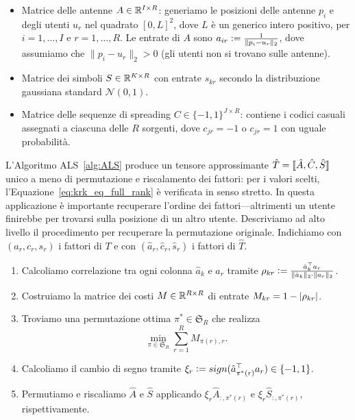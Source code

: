 \begin{itemize}
	\item Matrice delle antenne $ A \in \mathbb{R}^{I \times R}$: generiamo le posizioni delle antenne $ p_{i}
	      $ e degli utenti $ u_{r} $ nel quadrato $ [0,L]^2 $, dove $ L $ è un generico intero
	      positivo, per $ i = 1, \ldots, I $ e $ r = 1, \ldots, R $. Le entrate di $ A $ sono $ a_{ir}
		      \vcentcolon= \frac{1}{\| p_{i} - u_{r} \|_{2}}$, dove assumiamo che $ \| p_{i} - u_{r} \|_{2} >
		      0$ (gli utenti non si trovano sulle antenne).
	\item Matrice dei simboli $ S \in \mathbb{R}^{K \times R} $ con entrate $ s_{kr} $ secondo la
	      distribuzione gaussiana standard
	      $ \mathcal{N}(0,1) $.
	\item Matrice delle sequenze di spreading $ C \in \{-1,1\}^{J \times R}  $: contiene i codici
	      casuali assegnati a ciascuna delle $ R $ sorgenti, dove $ c_{jr} = -1 $ o $ c_{jr} = 1 $ con
	      uguale probabilità.
\end{itemize}
L'Algoritmo ALS~\ref{alg:ALS} produce un tensore approssimante $ \hat{T} = \dsqr{\hat{A}, \hat{C},
		\hat{S}} $ unico a meno di permutazione e riscalamento dei fattori: per i valori scelti, l'Equazione~\ref{eq:krk_eq_full_rank} è
verificata in senso stretto. In questa applicazione è importante recuperare l'ordine dei
fattori---altrimenti un utente finirebbe per trovarsi sulla posizione di un altro utente.
Descriviamo ad alto livello il procedimento per recuperare la permutazione originale. Indichiamo con $ (a_{r},c_{r},s_{r}) $ i fattori di $ T $ e
con $ (\hat{a}_{r}, \hat{c}_{r}, \hat{s}_{r}) $ i fattori di $ \hat{T} $.
\begin{enumerate}
	\item Calcoliamo correlazione tra ogni colonna $ \hat{a}_{k} $ e $ a_{r} $ tramite $ \rho_{kr}
		      \vcentcolon= \frac{\hat{a}^{\top}_{k}a_{r}}{\|\hat{a}_{k}\|_{2} \cdot \|a_{r} \|_{2}}$.
	\item Costruiamo la matrice dei costi $ M \in \mathbb{R}^{R\times R} $ di entrate $ M_{kr} = 1 -
		      \abs{\rho_{kr}} $.
	\item Troviamo una permutazione ottima $ \pi^* \in \mathfrak{S}_{R} $ che realizza
	      \begin{equation*}
		      \min_{\pi \in \mathfrak{S}_{R}} \sum_{r=1}^R M_{\pi(r),r}.
	      \end{equation*}
	\item Calcoliamo il cambio di segno tramite $ \xi_{r} \vcentcolon=
		      \mathop{sign}(\hat{a}^{\top}_{\pi^*(r)}a_{r}) \in \{-1,1\} $.
	\item Permutiamo e riscaliamo $ \hat{A} $ e $\hat{S} $ applicando $ \xi_{r}\hat{A}_{:, \pi^*(r)} $ e
	      $ \xi_{r}\hat{S}_{:, \pi^*(r)} $, rispettivamente.
\end{enumerate}


